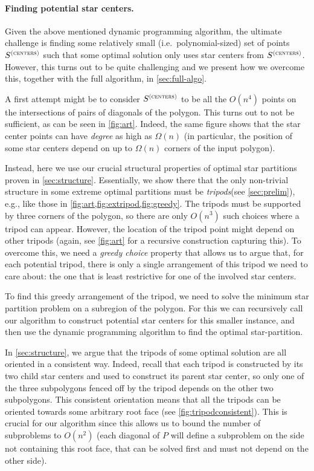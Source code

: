 \documentclass[10pt,a4paper]{article}
\newcommand\Scen{S^{\textsc{(centers)}}}
\begin{document}
\paragraph{Finding potential star centers.} Given the above mentioned dynamic programming algorithm, the ultimate challenge is finding some relatively small (i.e.\ polynomial-sized) set of points $\Scen$ such that some optimal solution only uses star centers from $\Scen$. However, this turns out to be quite challenging and we present how we overcome this, together with the full algorithm, in \cref{sec:full-algo}.

A first attempt might be to consider $\Scen$ to be all the $O(n^4)$ points on the intersections of pairs of diagonals of the polygon. This turns out to not be sufficient, as can be seen in \cref{fig:art}. Indeed, the same figure shows that the star center points can have \emph{degree} as high as $\Omega(n)$ (in particular, the position of some star centers depend on up to $\Omega(n)$ corners of the input polygon).

Instead, here we use our crucial structural properties of optimal star partitions proven in \cref{sec:structure}. Essentially, we show there that the only non-trivial structure in some extreme optimal partitions must be \emph{tripods}(see \cref{sec:prelim}), e.g., like those in \cref{fig:art,fig:extripod,fig:greedy}. The tripods must be supported by three corners of the polygon, so there are only $O(n^3)$ such choices where a tripod can appear. However, the location of the tripod point might depend on other tripods (again, see \cref{fig:art} for a recursive construction capturing this). To overcome this, we need a \emph{greedy choice} property that allows us to argue that, for each potential tripod, there is only a single arrangement of this tripod we need to care about: the one that is least restrictive for one of the involved star centers.

To find this greedy arrangement of the tripod, we need to solve the minimum star partition problem on a subregion of the polygon. For this we can recursively call our algorithm to construct potential star centers for this smaller instance, and then use the dynamic programming algorithm to find the optimal star-partition. 

In \cref{sec:structure}, we argue that the tripods of some optimal solution are all oriented in a consistent way. Indeed, recall that each tripod is constructed by its two child star centers and used to construct its parent star center, so only one of the three subpolygons fenced off by the tripod depends on the other two subpolygons. This consistent orientation means that all the tripods can be oriented towards some arbitrary root face (see \cref{fig:tripodconsistent}). This is crucial for our algorithm since this allows us to bound the number of subproblems to $O(n^2)$ (each diagonal of $P$ will define a subproblem on the side not containing this root face, that can be solved first and must not depend on the other side).
\end{document}

